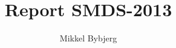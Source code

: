 \documentclass[]{report}
\title{Report SMDS-2013}
\author{Mikkel Bybjerg}
\begin{document}
\maketitle

\begin{abstract}
\end{abstract}
\end{document}
